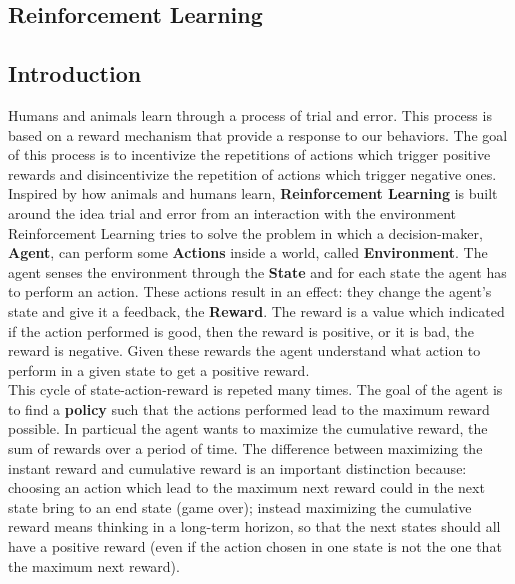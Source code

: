 \documentclass[14pt]{extarticle}
\def\sp{\vspace{5pt}}
\def\pp{\vspace{10pt}\newline}
\begin{document}
\newpage
\begin{center}
	\section{Reinforcement Learning}
\end{center}

\subsection{Introduction}
\sp
\begin{flushleft}
Humans and animals learn through a process of trial and error. This process is based on a reward mechanism that provide a response to our behaviors. The goal of this process is to incentivize the repetitions of actions which trigger positive rewards and disincentivize the repetition of actions which trigger negative ones.
\\
Inspired by how animals and humans learn, \textbf{Reinforcement Learning} is built around the idea trial and error from an interaction with the environment 
\pp
Reinforcement Learning tries to solve the problem in which a decision-maker, \textbf{Agent}, can perform some \textbf{Actions} inside a world, called \textbf{Environment}. The agent senses the environment through the \textbf{State} and for each state the agent has to perform an action. These actions result in an effect: they change the agent's state and give it a feedback, the \textbf{Reward}. The reward is a value which indicated if the action performed is good, then the reward is positive, or it is bad, the reward is negative. Given these rewards the agent understand what action to perform in a given state to get a positive reward. 
\\
This cycle of state-action-reward is repeted many times. The goal of the agent is to find a \textbf{policy} such that the actions performed lead to the maximum reward possible. In particual the agent wants to maximize the cumulative reward, the sum of rewards over a period of time. The difference between maximizing the instant reward and cumulative reward is an important distinction because: choosing an action which lead to the maximum next reward could in the next state bring to an end state (game over); instead maximizing the cumulative reward means thinking in a long-term horizon, so that the next states should all have a positive reward (even if the action chosen in one state is not the one that the
maximum next reward).


\end{flushleft}
\end{document}
